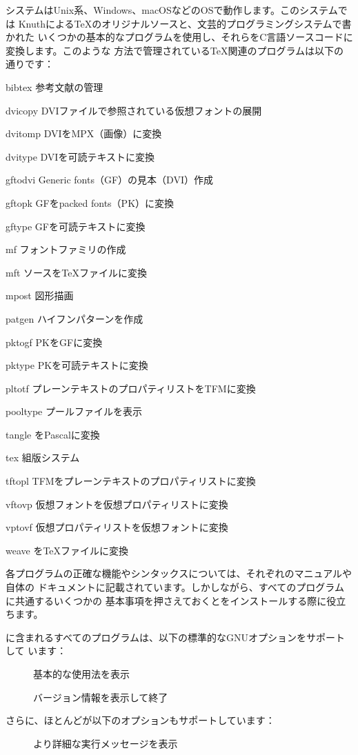 \documentclass[uplatex,dvipdfmx,12pt,tombow]{jsarticle}
\begin{document}
\Webc システムはUnix系、Windows、macOSなどのOSで動作します。このシステムでは
Knuthによる\TeX のオリジナルソースと、文芸的プログラミングシステム\WEB で書かれた
いくつかの基本的なプログラムを使用し、それらをC言語ソースコードに変換します。このような
方法で管理されている\TeX 関連のプログラムは以下の通りです：
%
\begin{cmddescription}
\item[bibtex] 参考文献の管理
\item[dvicopy] DVIファイルで参照されている仮想フォントの展開
\item[dvitomp] DVIをMPX（\MP 画像）に変換
\item[dvitype] DVIを可読テキストに変換
\item[gftodvi] Generic fonts（GF）の見本（DVI）作成
\item[gftopk] GFをpacked fonts（PK）に変換
\item[gftype] GFを可読テキストに変換
\item[mf] フォントファミリの作成
\item[mft] \MF ソースを\TeX ファイルに変換
\item[mpost] 図形描画
\item[patgen] ハイフンパターンを作成
\item[pktogf] PKをGFに変換
\item[pktype] PKを可読テキストに変換
\item[pltotf] プレーンテキストのプロパティリストをTFMに変換
\item[pooltype] \WEB プールファイルを表示
\item[tangle] \WEB をPascalに変換
\item[tex] 組版システム
\item[tftopl] TFMをプレーンテキストのプロパティリストに変換
\item[vftovp] 仮想フォントを仮想プロパティリストに変換
\item[vptovf] 仮想プロパティリストを仮想フォントに変換
\item[weave] \WEB を\TeX ファイルに変換
\end{cmddescription}
%
各プログラムの正確な機能やシンタックスについては、それぞれのマニュアルや\Webc 自体の
ドキュメントに記載されています。しかしながら、すべてのプログラムに共通するいくつかの
基本事項を押さえておくと\Webc をインストールする際に役立ちます。

\Webc に含まれるすべてのプログラムは、以下の標準的なGNUオプションをサポートして
います：
%
\begin{description}
\item[] 基本的な使用法を表示
\item[] バージョン情報を表示して終了
\end{description}
%
さらに、ほとんどが以下のオプションもサポートしています：
%
\begin{description}
\item[] より詳細な実行メッセージを表示
\end{description}
\end{document}
